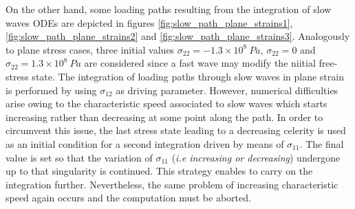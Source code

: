 On the other hand, some loading paths resulting from the integration of slow waves ODEs are depicted in figures \ref{fig:slow_path_plane_strains1}, \ref{fig:slow_path_plane_strains2} and \ref{fig:slow_path_plane_strains3}.
Analogously to plane stress cases, three initial values $\sigma_{22}=-1.3 \times 10^{8} \: Pa$, $\sigma_{22}=0$ and $\sigma_{22}=1.3 \times 10^8 \: Pa$ are considered since a fast wave may modify the niitial free-stress state.
The integration of loading paths through slow waves in plane strain is performed by using $\sigma_{12}$ as driving parameter.
However, numerical difficulties arise owing to the characteristic speed associated to slow waves which starts increasing rather than decreasing at some point along the path.
In order to circumvent this issue, the last stress state leading to a decreasing celerity is used as an initial condition for a second integration driven by means of $\sigma_{11}$.
The final value is set so that the variation of $\sigma_{11}$ (\textit{i.e increasing or decreasing}) undergone up to that singularity is continued.
This strategy enables to carry on the integration further.
Nevertheless, the same problem of increasing characteristic speed again occurs and the computation must be aborted.

